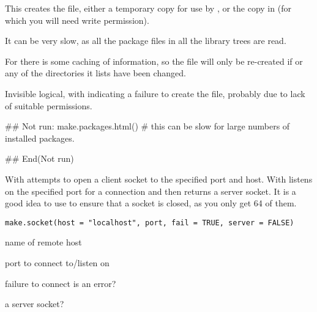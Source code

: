 %
\begin{Details}\relax
This creates the  file, either a temporary copy
for use by , or the copy in
(for which you will need write permission).

It can be very slow, as all the package  files in
all the library trees are read.

For  there is some caching of information, so the
file will only be re-created if  or any of the
directories it lists have been changed.
\end{Details}
%
\begin{Value}
Invisible logical, with  indicating a failure to create
the file, probably due to lack of suitable permissions.
\end{Value}
%
\begin{SeeAlso}\relax
{}
\end{SeeAlso}
%
\begin{Examples}
\begin{ExampleCode}
## Not run: 
make.packages.html()
# this can be slow for large numbers of installed packages.

## End(Not run)
\end{ExampleCode}
\end{Examples}
%
\begin{Description}\relax
With  attempts to open a client socket to the
specified port and host. With  listens on the
specified port for a connection and then returns a server socket. It is
a good idea to use  to ensure that a socket is
closed, as you only get 64 of them.
\end{Description}
%
\begin{Usage}
\begin{verbatim}
make.socket(host = "localhost", port, fail = TRUE, server = FALSE)
\end{verbatim}
\end{Usage}
%
\begin{Arguments}
\begin{ldescription}
\item[\code{host}] name of remote host
\item[\code{port}] port to connect to/listen on
\item[\code{fail}] failure to connect is an error?
\item[\code{server}] a server socket?
\end{ldescription}
\end{Arguments}
